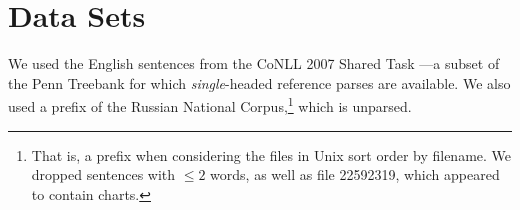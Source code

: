 \documentclass[11pt]{article}
\newcommand{\Note}[4][]{\todo[author=#2,color=#3,fancyline,#1]{#4}}
\newcommand{\noteJE}[2][]{\Note[#1]{JE}{green!40}{#2}}
\newcommand{\NoteJE}[2][]{\noteJE[inline,#1]{#2}}
\begin{document}





\section{Data Sets}
We used the English sentences from the CoNLL 2007 Shared Task \cite{CONLL-SHARED-2007}---a subset of the Penn Treebank for which {\em single}-headed reference parses are available.  We also used a prefix of the Russian National Corpus,\footnote{That is, a prefix when considering the files in Unix sort order by filename.  We dropped sentences with $\leq 2$ words, as well as file 22592319, which appeared to contain charts.} which is unparsed.
\end{document}
